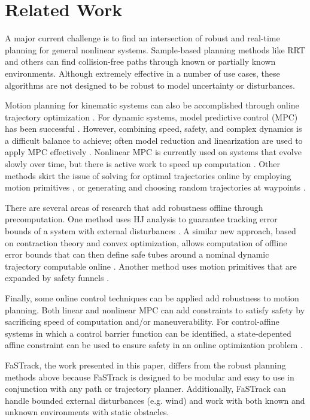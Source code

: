 \section{Related Work \label{sec:relatedwork}}
A major current challenge is to find an intersection of robust and real-time planning for general nonlinear systems. Sample-based planning methods like RRT \cite{Kuffner2000} and others \cite{Kavraki1996,Janson2015,Richter2016, Karaman2011, Kobilarov2012} can find collision-free paths through known or partially known environments. Although extremely effective in a number of use cases, these algorithms are not designed to be robust to model uncertainty or disturbances.

Motion planning for kinematic systems can also be accomplished through online trajectory optimization \cite{Schulman2013,Ratliff2009}. For dynamic systems, model predictive control (MPC) has been successful \cite{Qin2003}. However, combining speed, safety, and complex dynamics is a difficult balance to achieve; often model reduction and linearization are used to apply MPC effectively \cite{Vitus2008, Zeilinger2011, Richter2012}. Nonlinear MPC is currently used on systems that evolve slowly over time, but there is active work to speed up computation \cite{Diehl2002, Schildbach2016,Diehl2009, Neunert2016}. Other methods skirt the issue of solving for optimal trajectories online by employing motion primitives \cite{Gillula2010, Dey2016}, or generating and choosing random trajectories at waypoints \cite{Kalakrishnan2011, Schwesinger2013}. 

There are several areas of research that add robustness offline through precomputation.  One method uses HJ analysis to guarantee tracking error bounds of a system with external disturbances \cite{Bansal2017}. A similar new approach, based on contraction theory and convex optimization, allows computation of offline error bounds that can then define safe tubes around a nominal dynamic trajectory computable online \cite{Singh2017}.  Another method uses motion primitives that are expanded by safety funnels \cite{Majumdar2016}.

Finally, some online control techniques can be applied add robustness to motion planning. Both linear and nonlinear MPC can add constraints to satisfy safety \cite{Richards2006, DiCairano2016,Hoy2015} by sacrificing speed of computation and/or maneuverability. For control-affine systems in which a control barrier function can be identified, a state-depented affine constraint can be used to ensure safety in an online optimization problem \cite{Ames2014}.

FaSTrack, the work presented in this paper, differs from the robust planning methods above because FaSTrack is designed to be modular and easy to use in conjunction with any path or trajectory planner. Additionally, FaSTrack can handle bounded external disturbances (e.g. wind) and work with both known and unknown environments with static obstacles.